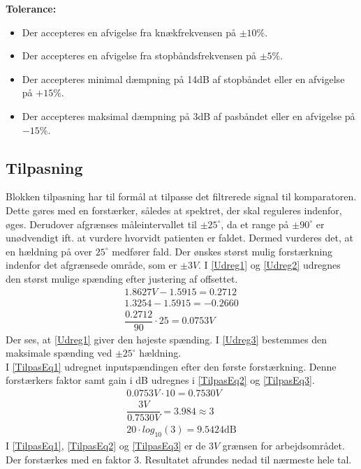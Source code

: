\textbf{Tolerance:}
\begin{itemize}
	\item Der accepteres en afvigelse fra knækfrekvensen på $\pm10\%$.
	\item Der accepteres en afvigelse fra stopbåndsfrekvensen på $\pm5\%$.
	\item Der accepteres minimal dæmpning på 14dB af stopbåndet eller en afvigelse på $+15\%$.
	\item Der accepteres maksimal dæmpning på 3dB af pasbåndet eller en afvigelse på $-15\%$.
\end{itemize}
\subsection{Tilpasning}\label{Tilpasningsblok}
Blokken tilpasning har til formål at tilpasse det filtrerede signal til komparatoren. Dette gøres med en forstærker, således at spektret, der skal reguleres indenfor, øges. Derudover afgrænses måleintervallet til $\pm25^{\circ}$, da et range på $\pm90^{\circ}$ er unødvendigt ift. at vurdere hvorvidt patienten er faldet. Dermed vurderes det, at en hældning på over $25^{\circ}$ medfører fald. Der ønskes størst mulig forstærkning indenfor det afgrænsede område, som er $\pm3V$. I \eqref{Udreg1} og \eqref{Udreg2} udregnes den størst mulige spænding efter justering af offsettet. 
\begin{align}
\label{Udreg1} 1.8627V - 1.5915 = 0.2712 \\
\label{Udreg2} 1.3254 - 1.5915 = -0.2660 \\
\label{Udreg3} \dfrac{0.2712}{90} \cdot 25 = 0.0753V
\end{align}
Der ses, at \eqref{Udreg1} giver den højeste spænding. I \eqref{Udreg3} bestemmes den maksimale spænding ved $\pm25^{\circ}$ hældning. \\
I \eqref{TilpasEq1} udregnet inputspændingen efter den første forstærkning. Denne forstærkers faktor samt gain i dB udregnes i \eqref{TilpasEq2} og \eqref{TilpasEq3}.
\begin{align}
\label{TilpasEq1} 0.0753V \cdot 10 = 0.7530V \\
\label{TilpasEq2} \dfrac{3V}{0.7530V} = 3.984 \approx 3 \\
\label{TilpasEq3} 20 \cdot log_{10} (3) = 9.5424\text{dB}
\end{align} 
I \eqref{TilpasEq1}, \eqref{TilpasEq2} og \eqref{TilpasEq3} er de $3V$ grænsen for arbejdsområdet. Der forstærkes med en faktor 3. Resultatet afrundes nedad til nærmeste hele tal. \\

